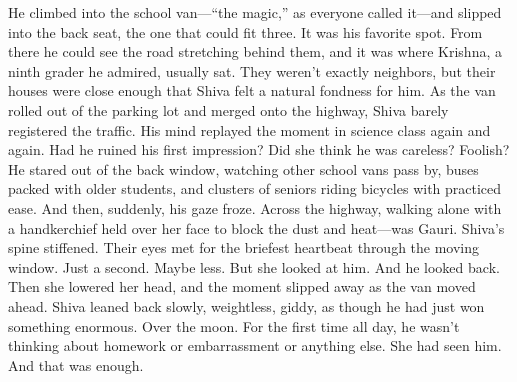 He climbed into the school van—``the magic,'' as everyone called it—and slipped into the back seat, the one that could fit three. It was his favorite spot. From there he could see the road stretching behind them, and it was where Krishna, a ninth grader he admired, usually sat. They weren't exactly neighbors, but their houses were close enough that Shiva felt a natural fondness for him. As the van rolled out of the parking lot and merged onto the highway, Shiva barely registered the traffic. His mind replayed the moment in science class again and again. Had he ruined his first impression? Did she think he was careless? Foolish? He stared out of the back window, watching other school vans pass by, buses packed with older students, and clusters of seniors riding bicycles with practiced ease. And then, suddenly, his gaze froze. Across the highway, walking alone with a handkerchief held over her face to block the dust and heat—was Gauri. Shiva's spine stiffened. Their eyes met for the briefest heartbeat through the moving window. Just a second. Maybe less. But she looked at him. And he looked back. Then she lowered her head, and the moment slipped away as the van moved ahead. Shiva leaned back slowly, weightless, giddy, as though he had just won something enormous. Over the moon. For the first time all day, he wasn't thinking about homework or embarrassment or anything else. She had seen him. And that was enough.